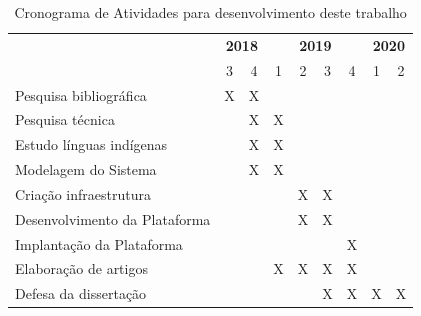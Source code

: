\documentclass[journal]{IEEEtran}
\begin{document}
\begin{table}[!ht]
	\centering
	\caption{Cronograma de Atividades para desenvolvimento deste trabalho}
	\begin{tabular}{|l|c|c|c|c|c|c|c|c|} \hline
	 \multirow{2}{*}{}& \multicolumn{2}{c|}{{\bf2018}}& \multicolumn{4}{c|}{{\bf2019}}& \multicolumn{2}{c|}{{\bf2020}}
	 \\ \cline{2-9} 
                       				              &  3  &  4  &  1  &  2  &  3  &  4  &  1  &  2 \\ \hline
		\scriptsize{Pesquisa bibliográfica} 	  &  X  &  X  &     &     &     &     &     &    \\ \hline
		\scriptsize{Pesquisa técnica}	          &     &  X  &  X  &     &     &     &     &    \\ \hline
		\scriptsize{Estudo línguas indígenas}	  &     &  X  &  X  &     &     &     &     &    \\ \hline
		\scriptsize{Modelagem do Sistema}	      &     &  X  &  X  &     &     &     &     &    \\ \hline
	    \scriptsize{Criação infraestrutura}       &     &     &     &  X  &  X  &     &     &    \\ \hline
	    \scriptsize{Desenvolvimento da Plataforma}&     &     &     &  X  &  X  &     &     &    \\ \hline
	    \scriptsize{Implantação da Plataforma}    &     &     &     &     &     &  X  &     &    \\ \hline
	    \scriptsize{Elaboração de artigos}        &     &     &  X  &  X  &  X  &  X  &     &    \\ \hline
	    \scriptsize{Defesa da dissertação}        &     &     &     &     &  X  &  X  &  X  &  X \\ \hline
	\end{tabular}
	\label{t_cronograma}
\end{table}
\end{document}
